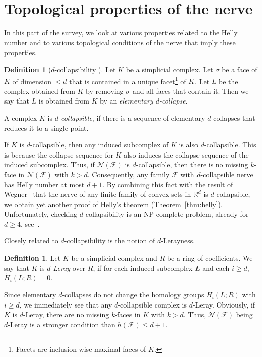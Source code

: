 \documentclass[a4paper,12pt]{amsart}
\newcommand{\R}{\mathbb{R}} 	%
\theoremstyle{definition}
\newtheorem{definition}[theorem]{Definition}
\begin{document}
\section{Topological properties of the nerve}\label{sec:nerveprop}
In this part of the survey, we look at various properties related to the Helly number
and to various topological conditions of the nerve that imply these properties.

\begin{definition}[$d$-collapsibility \cite{wegner75}]
Let $K$ be a simplicial complex.
Let $\sigma$ be a face of $K$ of dimension $<d$ that is contained in a unique facet\footnote{Facets are inclusion-wise maximal faces of $K$.} of $K$.
Let $L$ be the complex obtained from $K$ by removing $\sigma$ and all faces that contain it.
Then we say that $L$ is obtained from $K$ by an \emph{elementary $d$-collapse}.

A complex $K$ is \emph{$d$-collapsible}, if there is a sequence of elementary $d$-collapses that reduces it to a single point. 
\end{definition}
If $K$ is $d$-collapsible, then any induced subcomplex of $K$ is also $d$-collapsible.
This is because the collapse sequence for $K$ also induces the collapse sequence of the induced subcomplex.
Thus, if $\mathcal N(\mathcal F)$ is $d$-collapsible, then there is no missing $k$-face in $\mathcal N(\mathcal F)$ with $k>d$.
Consequently, any family $\mathcal F$ with $d$-collapsible nerve has Helly number at most $d+1$.  
By combining this fact with the result of Wegner~\cite{wegner75} that the nerve of any finite family of convex sets in $\R^d$ is $d$-collapsible,
we obtain yet another proof of Helly's theorem (Theorem~\ref{thm:helly}).
Unfortunately, checking $d$-collapsibility is an NP-complete problem, already for $d\geq 4$, see~\cite{dcollapse}.

Closely related to $d$-collapsibility is the notion of $d$-Lerayness.
\begin{definition}
Let $K$ be a simplicial complex
and $R$ be a ring of coefficients. 
We say that $K$ is \emph{$d$-Leray} over $R$, if for each induced subcomplex $L$ and each $i\geq d$, $\widetilde{H}_i(L;R)=0$.
\end{definition}
Since elementary $d$-collapses do not change the homology groups $\widetilde{H}_i(L;R)$ with $i\geq d$, we immediately see that any $d$-collapsible complex is $d$-Leray. Obviously, if $K$ is $d$-Leray, there are no missing $k$-faces in $K$ with $k>d$. Thus, $\mathcal N(\mathcal F)$ being $d$-Leray is a stronger condition than $h(\mathcal F)\leq d+1$.
 
\end{document}
